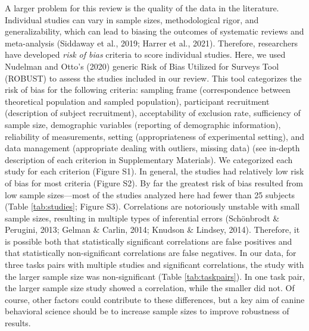 \documentclass[
  ,pub,floatsintext]{apa6}
\begin{document}
A larger problem for this review is the quality of the data in the literature. Individual studies can vary in sample sizes, methodological rigor, and generalizability, which can lead to biasing the outcomes of systematic reviews and meta-analysis (Siddaway et al., 2019; Harrer et al., 2021). Therefore, researchers have developed \emph{risk of bias} criteria to score individual studies. Here, we used Nudelman and Otto's (2020) generic Risk of Bias Utilized for Surveys Tool (ROBUST) to assess the studies included in our review. This tool categorizes the risk of bias for the following criteria: sampling frame (correspondence between theoretical population and sampled population), participant recruitment (description of subject recruitment), acceptability of exclusion rate, sufficiency of sample size, demographic variables (reporting of demographic information), reliability of measurements, setting (appropriateness of experimental setting), and data management (appropriate dealing with outliers, missing data) (see in-depth description of each criterion in Supplementary Materials). We categorized each study for each criterion (Figure S1). In general, the studies had relatively low risk of bias for most criteria (Figure S2). By far the greatest risk of bias resulted from low sample sizes---most of the studies analyzed here had fewer than 25 subjects (Table \ref{tab:studies}; Figure S3). Correlations are notoriously unstable with small sample sizes, resulting in multiple types of inferential errors (Schönbrodt \& Perugini, 2013; Gelman \& Carlin, 2014; Knudson \& Lindsey, 2014). Therefore, it is possible both that statistically significant correlations are false positives and that statistically non-significant correlations are false negatives. In our data, for three tasks pairs with multiple studies and significant correlations, the study with the larger sample size was non-significant (Table \ref{tab:taskpairs}). In one task pair, the larger sample size study showed a correlation, while the smaller did not. Of course, other factors could contribute to these differences, but a key aim of canine behavioral science should be to increase sample sizes to improve robustness of results.
\end{document}
